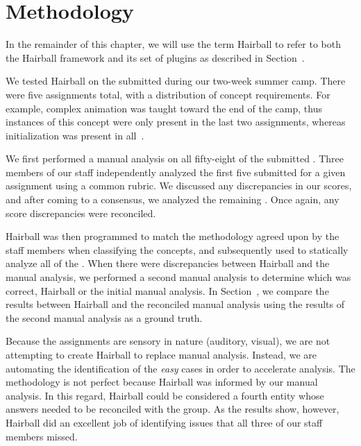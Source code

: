\section{Methodology} 
In the remainder of this chapter, we will use the term Hairball to refer to
both the Hairball framework and its set of plugins as described in
Section~.

We tested Hairball on the  submitted during our two-week summer
camp.  There were five assignments total, with a distribution of concept
requirements. For example, complex animation was taught toward the end of the
camp, thus instances of this concept were only present in the last two
assignments, whereas initialization was present in
all~\cite{Franklin:2013:SBO}.

We first performed a manual analysis on all fifty-eight of the submitted
.  Three members of our staff independently analyzed the first five
 submitted for a given assignment using a common rubric. We
discussed any discrepancies in our scores, and after coming to a consensus, we
analyzed the remaining . Once again, any score discrepancies were
reconciled.

Hairball was then programmed to match the methodology agreed upon by the staff
members when classifying the concepts, and subsequently used to statically
analyze all of the .  When there were discrepancies between
Hairball and the manual analysis, we performed a second manual analysis to
determine which was correct, Hairball or the initial manual analysis. In
Section~, we compare the results between Hairball and the
reconciled manual analysis using the results of the second manual analysis as a
ground truth.

Because the assignments are sensory in nature (auditory, visual), we are not
attempting to create Hairball to replace manual analysis.  Instead, we are
automating the identification of the \emph{easy} cases in order to accelerate
analysis.  The methodology is not perfect because Hairball was informed by our
manual analysis. In this regard, Hairball could be considered a fourth entity
whose answers needed to be reconciled with the group.  As the results show,
however, Hairball did an excellent job of identifying issues that all three of
our staff members missed.
